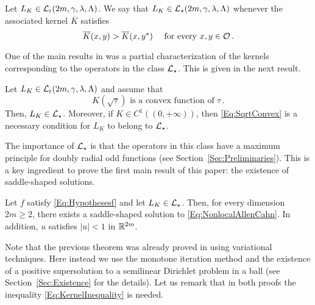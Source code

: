 \begin{definition}
	Let $L_K \in \mathcal{L}_{\mathrm{r}}(2m,\gamma,\lambda, \Lambda)$. We say that $L_K\in \mathcal{L}_\star (2m,\gamma,\lambda, \Lambda)$ whenever the associated kernel $\overline{K}$ satisfies
	\begin{equation}
	\label{Eq:KernelInequality}
	\overline{K}(x,y) > \overline{K}(x, y^\star) \quad \text{ for every }x,y \in \mathcal{O}\,.
	\end{equation}
\end{definition}

One of the main results in \cite{FelipeSanz-Perela:IntegroDifferentialI} was a partial characterization of the kernels corresponding to the operators in the class $\mathcal{L}_\star$. This is given in the next result.

\begin{theorem}
	\label{Th:CharacterizationLstar}
	Let $L_K \in \mathcal{L}_{\mathrm{r}}(2m,\gamma,\lambda, \Lambda)$ and assume that 
	\begin{equation}
	\label{Eq:SqrtConvex}	
	K(\sqrt{\tau}) \text{ is a convex function of }\tau\,.
	\end{equation}
	Then, $L_K\in \mathcal{L}_\star$. Moreover, if $K\in C^1((0,+\infty))$, then \eqref{Eq:SqrtConvex} is a necessary condition for $L_K$ to belong to $\mathcal{L}_\star$.
\end{theorem}

The importance of $\mathcal{L}_\star$ is that the operators in this class have a maximum principle for doubly radial odd functions (see Section~\ref{Sec:Preliminaries}). This is a key ingredient to prove the first main result of this paper: the existence of saddle-shaped solutions.

\begin{theorem}
	\label{Th:Existence}
	Let $f$ satisfy \eqref{Eq:Hypothesesf} and let $L_K\in \mathcal{L}_\star$. Then, for every dimension $2m \geq 2$, there exists a saddle-shaped solution to \eqref{Eq:NonlocalAllenCahn}. In addition, $u$ satisfies $|u|<1$ in $\mathbb{R}^{2m}$.
\end{theorem}

Note that the previous theorem was already proved in \cite{FelipeSanz-Perela:IntegroDifferentialI} using variational techniques. Here instead we use the monotone iteration method and the existence of a positive supersolution to a semilinear Dirichlet problem in a ball (see Section~\ref{Sec:Existence} for the details). Let us remark that in both proofs the inequality \eqref{Eq:KernelInequality} is needed.



